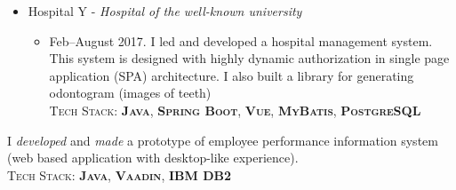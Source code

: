 \documentclass[11pt,a4paper,sans]{moderncv} %
\begin{document}
{\begin{itemize}
\begin{itemize}
  \end{itemize}
  \item Hospital Y - \textit{Hospital of the well-known university}
  \begin{itemize}
      \item Feb--August 2017. I led and developed a hospital management system. This system is designed with highly dynamic authorization in single page application (SPA) architecture. I also built a library for generating odontogram (images of teeth)\\ \textsc{Tech Stack: \textbf{Java}, \textbf{Spring Boot}, \textbf{Vue}, \textbf{MyBatis}, \textbf{PostgreSQL}}
  \end{itemize}
\end{itemize}
}

{
I \textit{developed} and \textit{made} a prototype of employee performance information system (web based application with desktop-like experience).\\
\textsc{Tech Stack: \textbf{Java}, \textbf{Vaadin}, \textbf{IBM DB2}}
}
\end{document}
